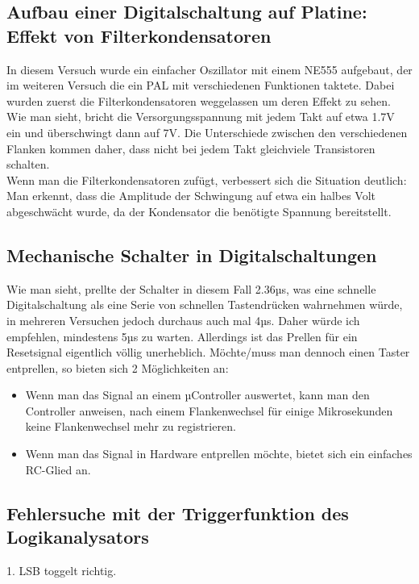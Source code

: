 \setcounter{section}{8}
\subsection{Aufbau einer Digitalschaltung auf Platine: Effekt von Filterkondensatoren}
In diesem Versuch wurde ein einfacher Oszillator mit einem NE555 aufgebaut, der im weiteren Versuch die ein PAL mit verschiedenen Funktionen taktete. Dabei wurden zuerst die Filterkondensatoren weggelassen um deren Effekt zu sehen.
Wie man sieht, bricht die Versorgungsspannung mit jedem Takt auf etwa 1.7V ein und überschwingt dann auf 7V. Die Unterschiede zwischen den verschiedenen Flanken kommen daher, dass nicht bei jedem Takt gleichviele Transistoren schalten.\\
Wenn man die Filterkondensatoren zufügt, verbessert sich die Situation deutlich:
Man erkennt, dass die Amplitude der Schwingung auf etwa ein halbes Volt abgeschwächt wurde, da der Kondensator die benötigte Spannung bereitstellt.

\subsection{Mechanische Schalter in Digitalschaltungen}
Wie man sieht, prellte der Schalter in diesem Fall 2.36µs, was eine schnelle Digitalschaltung als eine Serie von schnellen Tastendrücken wahrnehmen würde, in mehreren Versuchen jedoch durchaus auch mal 4µs. Daher würde ich empfehlen, mindestens 5µs zu warten. Allerdings ist das Prellen für ein Resetsignal eigentlich völlig unerheblich. Möchte/muss man dennoch einen Taster entprellen, so bieten sich 2 Möglichkeiten an:
\begin{itemize}
	\item Wenn man das Signal an einem µController auswertet, kann man den Controller anweisen, nach einem Flankenwechsel für einige Mikrosekunden keine Flankenwechsel mehr zu registrieren.
	\item Wenn man das Signal in Hardware entprellen möchte, bietet sich ein einfaches RC-Glied an.
\end{itemize}



\subsection{Fehlersuche mit der Triggerfunktion des Logikanalysators}
1. LSB toggelt richtig.


